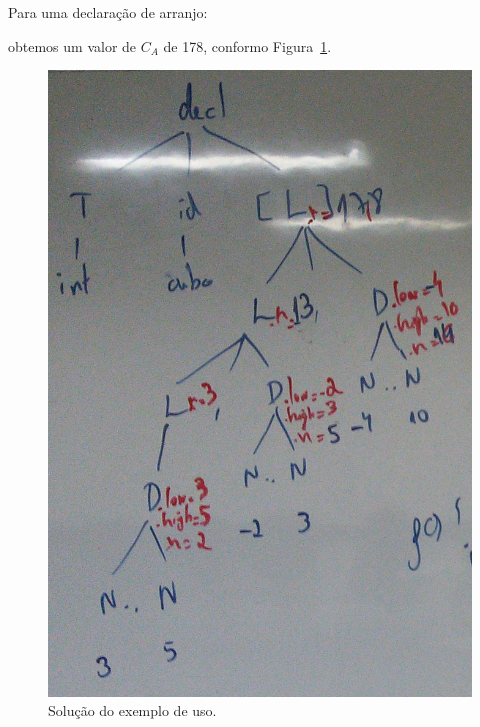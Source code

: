 \documentclass{compiladores}
\begin{document}
Para uma declaração de arranjo:
\begin{center}
\end{center}
obtemos um valor de $C_A$ de 178, conformo Figura~\ref{69-fig1}.

\begin{figure}[!htb]
  \centering
  \includegraphics[width=.5\linewidth]{img/69-1.jpg}
  \caption{Solução do exemplo de uso.}
  \label{69-fig1}
\end{figure}
\end{document}
